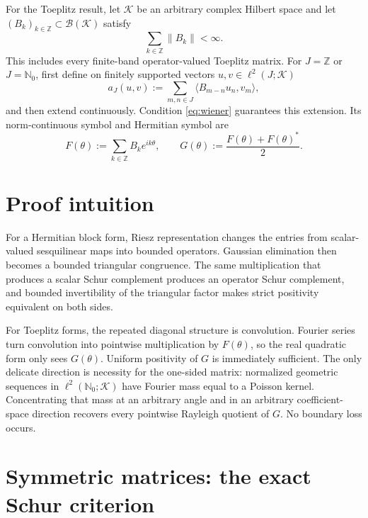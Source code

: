 \documentclass[11pt]{article}
\theoremstyle{definition}
\newcommand{\N}{\mathbb N_0}
\newcommand{\K}{\mathcal K}
\newcommand{\B}{\mathcal B}
\begin{document}
For the Toeplitz result, let $\K$ be an arbitrary complex Hilbert space and
let $(B_k)_{k\in\mathbb Z}\subset\B(\K)$ satisfy
\begin{equation}\label{eq:wiener}
  \sum_{k\in\mathbb Z}\|B_k\|<\infty.
\end{equation}
This includes every finite-band operator-valued Toeplitz matrix.  For
$J=\mathbb Z$ or $J=\N$, first define on finitely supported vectors
$u,v\in\ell^2(J;\K)$
\begin{equation}\label{eq:toeplitzform}
  a_J(u,v):=\sum_{m,n\in J}
  \langle B_{m-n}u_n,v_m\rangle,
\end{equation}
and then extend continuously.  Condition \eqref{eq:wiener} guarantees this
extension.  Its norm-continuous symbol and Hermitian symbol are
\begin{equation}\label{eq:symbols}
  F(\theta):=\sum_{k\in\mathbb Z}B_ke^{ik\theta},\qquad
  G(\theta):=\frac{F(\theta)+F(\theta)^*}{2}.
\end{equation}

\section{Proof intuition}

For a Hermitian block form, Riesz representation changes the entries from
scalar-valued sesquilinear maps into bounded operators.  Gaussian elimination
then becomes a bounded triangular congruence.  The same multiplication that
produces a scalar Schur complement produces an operator Schur complement, and
bounded invertibility of the triangular factor makes strict positivity
equivalent on both sides.

For Toeplitz forms, the repeated diagonal structure is convolution.  Fourier
series turn convolution into pointwise multiplication by $F(\theta)$, so the
real quadratic form only sees $G(\theta)$.  Uniform positivity of $G$ is
immediately sufficient.  The only delicate direction is necessity for the
one-sided matrix: normalized geometric sequences in $\ell^2(\N;\K)$ have
Fourier mass equal to a Poisson kernel.  Concentrating that mass at an
arbitrary angle and in an arbitrary coefficient-space direction recovers
every pointwise Rayleigh quotient of $G$.  No boundary loss occurs.

\section{Symmetric matrices: the exact Schur criterion}
\end{document}
